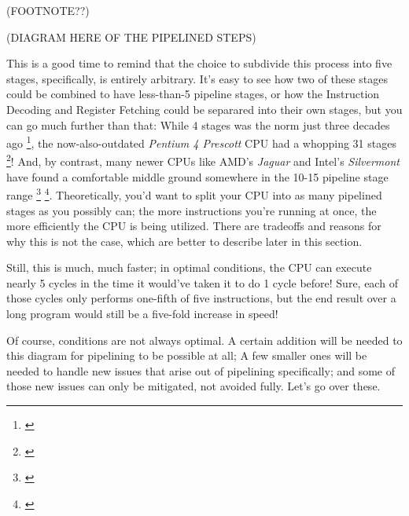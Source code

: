 \documentclass[12pt,twoside]{reedthesis}
\begin{document}
(FOOTNOTE??)

(DIAGRAM HERE OF THE PIPELINED STEPS)

This is a good time to remind that the choice to subdivide this process into five stages, specifically, is entirely arbitrary. It's easy to see how two of these stages could be combined to have less-than-5 pipeline stages, or how the Instruction Decoding and Register Fetching could be separared into their own stages, but you can go much further than that: While 4 stages was the norm just three decades ago \footnote{\cite{denning}}, the now-also-outdated \textit{Pentium 4 Prescott} CPU had a whopping 31 stages \footnote{\cite{shimpi}}! And, by contrast, many newer CPUs like AMD's \textit{Jaguar} and Intel's \textit{Silvermont} have found a comfortable middle ground somewhere in the 10-15 pipeline stage range \footnote{\cite{kanter1}} \footnote{\cite{kanter2}}.  Theoretically, you'd want to split your CPU into as many pipelined stages as you possibly can; the more instructions you're running at once, the more efficiently the CPU is being utilized. There are tradeoffs and reasons for why this is not the case, which are better to describe later in this section.

Still, this is much, much faster;  in optimal conditions, the CPU can execute nearly 5 cycles in the time it would've taken it to do 1 cycle before! Sure, each of those cycles only performs one-fifth of five instructions, but the end result over a long program would still be a five-fold increase in speed!

Of course, conditions are not always optimal. A certain addition will be needed to this diagram for pipelining to be possible at all; A few smaller ones will be needed to handle new issues that arise out of pipelining specifically; and some of those new issues can only be mitigated, not avoided fully. Let's go over these.
\end{document}
